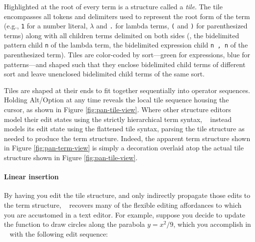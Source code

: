 Highlighted at the root of every term is a structure called
a \emph{tile}.
The tile encompasses all tokens and delimiters used to represent
the root form of the term (e.g., \texttt{1} for a number literal,
$\lambda$ and \texttt{.} for lambda terms,
\texttt{(} and \texttt{)} for parenthesized terms) along with
all children terms delimited on both sides (\eg,
the bidelimited pattern child \texttt{n} of the lambda term,
the bidelimited expression child \texttt{n , n} of
the parenthesized term).
Tiles are color-coded by sort---green for expressions, blue
for patterns---and shaped such that they enclose bidelimited
child terms of different sort and leave unenclosed bidelimited
child terms of the same sort.

Tiles are shaped at their ends to fit together sequentially
into operator sequences.
Holding Alt/Option at any time reveals the local tile sequence
housing the cursor, as shown in Figure \ref{fig:pan-tile-view}.
Where other structure editors model their edit states
using the strictly hierarchical term syntax,
\tylr~ instead models its edit state
using the flattened tile syntax, parsing the tile structure
as needed to produce the term structure.
Indeed, the apparent term structure shown in Figure
\ref{fig:pan-term-view} is simply a
decoration overlaid atop the actual tile structure shown in
Figure \ref{fig:pan-tile-view}.



\paragraph{Linear insertion}
By having you edit the tile structure, and only
indirectly propagate those edits to the term structure,
\tylr~ recovers many of the flexible editing affordances to
which you are accustomed in a text editor.
For example, suppose you decide to update the function to
draw circles along the parabola $y = x^2/9$, which you
accomplish in \tylr~ with the following edit sequence:

